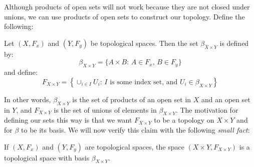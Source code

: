 Although products of open sets will not work because they are not closed under unions, we can use products of open sets to construct our topology. Define the following: 
\begin{definition}
	Let $(X,F_x)$ and $(Y,F_y)$ be topological spaces. Then the set $\beta_{X\times Y}$ is defined by:
	\[\beta_{X\times Y} = \{A\times B:\,A\in F_x,\,B\in F_y\}\]
	and define:
	\[F_{X\times Y} = \left\{\cup_{i\in I} U_i:\,I \text{ is some index set, and }U_i\in \beta_{X\times Y}\right\}\]
\end{definition}
In other words, $\beta_{X\times Y}$ is the set of products of an open set in $X$ and an open set in $Y$, and $F_{X\times Y}$ is the set of unions of elements in $\beta_{X\times Y}$. The motivation for defining our sets this way is that we want $F_{X\times Y}$ to be a topology on $X\times Y$ and for $\beta$ to be its basis. We will now verify this claim with the following \emph{small fact}: 
\begin{theorem}
	If $(X,F_x)$ and $(Y,F_y)$ are topological spaces, the space $(X\times Y,F_{X\times Y})$ is a topological space with basis $\beta_{X\times Y}$. 
\end{theorem}
